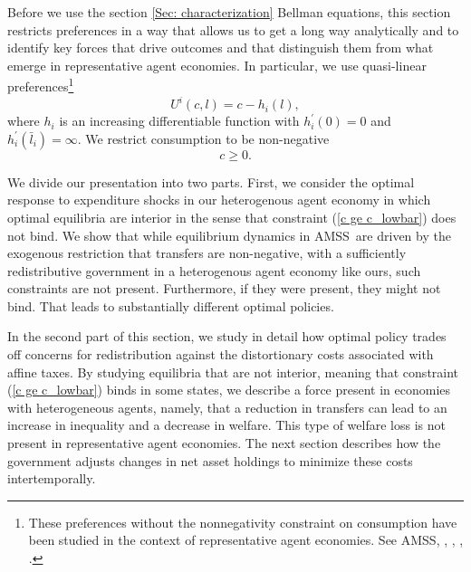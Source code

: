 \documentclass[thmsb,11pt]{article}
\begin{document}
\smallskip
Before we use the section \ref{Sec: characterization}  Bellman equations, this section restricts preferences in a way that allows us to get a long way analytically and to identify
key forces that drive outcomes and that  distinguish them from what emerge in  representative agent economies.
In particular, we use  quasi-linear preferences\footnote{These preferences without the nonnegativity constraint on consumption have been studied in
the context of representative
agent economies.
See  AMSS, \cite{Farhi2010}, \cite{Battaglini2007,Battaglini2008}, \cite{Yared2012}, \cite{Faraglia2011}.}
\begin{equation}
U^{i}\left( c,l\right) =c-h_{i}(l),  \label{quasilinear}
\end{equation}%
where $h_{i}$ is an increasing differentiable function with $h_{i}^{\prime
}\left( 0\right) =0$ and $h_{i}^{\prime }\left( \bar{l}_{i}\right) =\infty $.
We restrict consumption  to be non-negative
\begin{equation}
c\geq 0.  \label{c ge c_lowbar}
\end{equation}%

We divide our presentation   into two parts. First, we
consider the optimal response to expenditure shocks in our heterogenous agent
economy in which optimal equilibria are interior in the sense that  constraint (\ref{c ge c_lowbar}) does not bind. %
We show that while  equilibrium dynamics in AMSS\ are
driven by the exogenous restriction that transfers are non-negative,  with a sufficiently redistributive government in
a heterogenous agent economy  like ours, such
constraints are not present. Furthermore, if they were present, they might not bind.  That leads to substantially different  optimal policies.


In the second part of this section, we study in detail how optimal policy trades off concerns for redistribution against the distortionary costs associated with affine taxes. By studying equilibria that are not interior, meaning that constraint (\ref{c ge c_lowbar}) binds in
some states, we describe a force
present in economies with heterogeneous %
agents, namely, that a
reduction in transfers can lead to an increase in inequality and a
decrease in welfare. This type of welfare loss is not present in
representative agent economies. The next section describes how the government adjusts  changes in net asset holdings to minimize these costs intertemporally.
\end{document}
